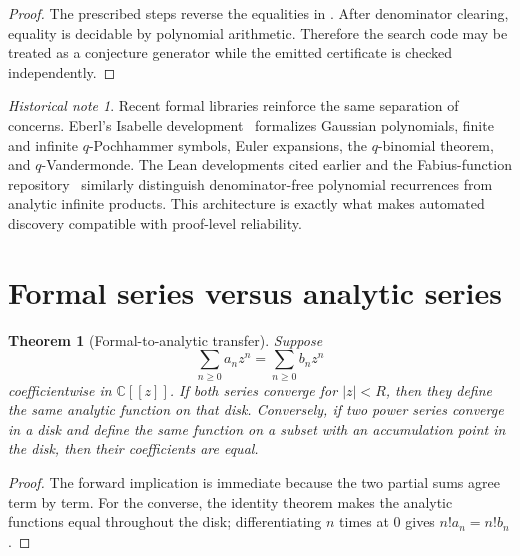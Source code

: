 \documentclass[11pt,oneside,openany]{book}
\newtheorem{theorem}{Theorem}[chapter]
\theoremstyle{definition}
\theoremstyle{remark}
\newtheorem{historicalnote}[historicalnote]{Historical note}
\newcommand{\C}{\mathbb C}
\newcommand{\abs}[1]{\lvert #1\rvert}
\begin{document}
\begin{proof}
The prescribed steps reverse the equalities in
.  After denominator clearing, equality is decidable by polynomial arithmetic.  Therefore the search code may be treated as a conjecture generator while the emitted certificate is checked independently.
\end{proof}

\begin{historicalnote}
Recent formal libraries reinforce the same separation of concerns.  Eberl's Isabelle development~\cite{Eberl2024QAnalogues} formalizes Gaussian polynomials, finite and infinite $q$-Pochhammer symbols, Euler expansions, the $q$-binomial theorem, and $q$-Vandermonde.  The Lean developments cited earlier and the Fabius-function repository~\cite{ReshetnikovProveIt2026} similarly distinguish denominator-free polynomial recurrences from analytic infinite products.  This architecture is exactly what makes automated discovery compatible with proof-level reliability.
\end{historicalnote}

\section{Formal series versus analytic series}

\begin{theorem}[Formal-to-analytic transfer]\label{thm:formal-analytic-transfer}
Suppose
\[
 \sum_{n\ge0}a_nz^n=\sum_{n\ge0}b_nz^n
\]
coefficientwise in $\C[[z]]$.  If both series converge for $\abs z<R$, then they define the same analytic function on that disk.  Conversely, if two power series converge in a disk and define the same function on a subset with an accumulation point in the disk, then their coefficients are equal.
\end{theorem}

\begin{proof}
The forward implication is immediate because the two partial sums agree term by term.  For the converse, the identity theorem makes the analytic functions equal throughout the disk; differentiating $n$ times at $0$ gives $n!a_n=n!b_n$.
\end{proof}
\end{document}
